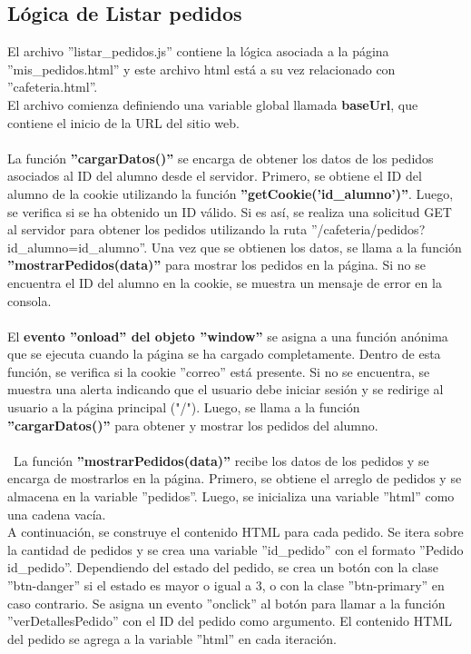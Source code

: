 \documentclass[12pt]{report}
\begin{document}
\subsection{Lógica de Listar pedidos}
El archivo ''listar\_pedidos.js'' contiene la lógica asociada a la página ''mis\_pedidos.html'' y este archivo html está a su vez relacionado con ''cafeteria.html''.\\
El archivo comienza definiendo una variable global llamada \textbf{baseUrl}, que contiene el inicio de la URL del sitio web.
\\\\
La función \textbf{''cargarDatos()''} se encarga de obtener los datos de los pedidos asociados al ID del alumno desde el servidor. Primero, se obtiene el ID del alumno de la cookie utilizando la función \textbf{''getCookie('id\_alumno')''}. Luego, se verifica si se ha obtenido un ID válido. Si es así, se realiza una solicitud GET al servidor para obtener los pedidos utilizando la ruta ''/cafeteria/pedidos?id\_alumno={id\_alumno}''. Una vez que se obtienen los datos, se llama a la función \textbf{''mostrarPedidos(data)''} para mostrar los pedidos en la página. Si no se encuentra el ID del alumno en la cookie, se muestra un mensaje de error en la consola.
\\\\
El \textbf{evento ''onload'' del objeto ''window''} se asigna a una función anónima que se ejecuta cuando la página se ha cargado completamente. Dentro de esta función, se verifica si la cookie ''correo'' está presente. Si no se encuentra, se muestra una alerta indicando que el usuario debe iniciar sesión y se redirige al usuario a la página principal ("/"). Luego, se llama a la función \textbf{''cargarDatos()''} para obtener y mostrar los pedidos del alumno.
\\\\\
La función \textbf{''mostrarPedidos(data)''} recibe los datos de los pedidos y se encarga de mostrarlos en la página. Primero, se obtiene el arreglo de pedidos y se almacena en la variable ''pedidos''. Luego, se inicializa una variable ''html'' como una cadena vacía.
\\
A continuación, se construye el contenido HTML para cada pedido. Se itera sobre la cantidad de pedidos y se crea una variable ''id\_pedido'' con el formato ''Pedido {id\_pedido}''. Dependiendo del estado del pedido, se crea un botón con la clase ''btn-danger'' si el estado es mayor o igual a 3, o con la clase ''btn-primary'' en caso contrario. Se asigna un evento ''onclick'' al botón para llamar a la función ''verDetallesPedido'' con el ID del pedido como argumento. El contenido HTML del pedido se agrega a la variable ''html'' en cada iteración.
\end{document}
